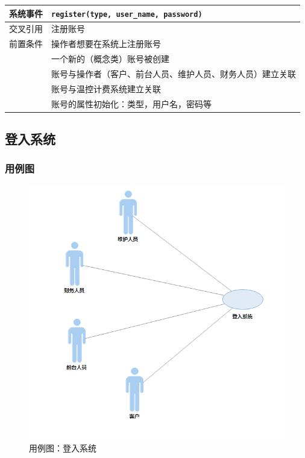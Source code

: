 \documentclass[blue,normal,cn]{elegantnote}
\newcommand{\code}[1]{\colorbox{light-gray}{\texttt{#1}}}
\begin{document}
\begin{center}
    \begin{tabular}{|>{\centering}m{}|m{}|}
        \hline
        系统事件                  & \multicolumn{1}{l|}{\code{register(type, user\_name, password)}} \\
        \hline
        交叉引用                  & 注册账号                                                         \\
        \hline
        前置条件                  & 操作者想要在系统上注册账号                                       \\
        \hline
        \multirow{4}{*}{后置条件} & 一个新的（概念类）账号被创建                                     \\
        \cline{2-2}
                                  & 账号与操作者（客户、前台人员、维护人员、财务人员）建立关联       \\
        \cline{2-2}
                                  & 账号与温控计费系统建立关联                                       \\
        \cline{2-2}
                                  & 账号的属性初始化：类型，用户名，密码等                           \\
        \hline
    \end{tabular}
\end{center}

\subsection{登入系统}
\subsubsection{用例图}

\begin{figure}[H]
    \centering
    \includegraphics[width=.5\textwidth]{fig/276007.png}
    \caption{用例图：登入系统}
    \label{fig:276007}
\end{figure}
\end{document}
